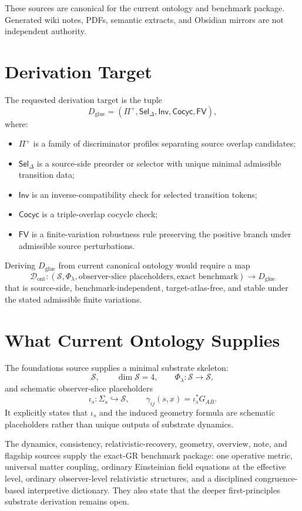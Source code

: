\documentclass[11pt]{article}
\newcommand{\Sub}{\mathcal{S}}
\newcommand{\PhiOrd}{\Phi_{\lambda}}
\newcommand{\Prof}{\Pi^{+}}
\newcommand{\Sel}{\mathsf{Sel}_{\Delta}}
\begin{document}
These sources are canonical for the current ontology and benchmark package.
Generated wiki notes, PDFs, semantic extracts, and Obsidian mirrors are not
independent authority.

\section{Derivation Target}

The requested derivation target is the tuple
\[
  D_{\mathrm{glue}}
  =
  (\Prof,\Sel,\mathsf{Inv},\mathsf{Cocyc},\mathsf{FV}),
\]
where:
\begin{itemize}
  \item \(\Prof\) is a family of discriminator profiles separating source
  overlap candidates;
  \item \(\Sel\) is a source-side preorder or selector with unique minimal
  admissible transition data;
  \item \(\mathsf{Inv}\) is an inverse-compatibility check for selected
  transition tokens;
  \item \(\mathsf{Cocyc}\) is a triple-overlap cocycle check;
  \item \(\mathsf{FV}\) is a finite-variation robustness rule preserving the
  positive branch under admissible source perturbations.
\end{itemize}

Deriving \(D_{\mathrm{glue}}\) from current canonical ontology would require a
map
\[
  \mathcal{D}_{\mathrm{ont}}:
  (\Sub,\PhiOrd,\text{observer-slice placeholders},\text{exact benchmark})
  \longrightarrow
  D_{\mathrm{glue}}
\]
that is source-side, benchmark-independent, target-atlas-free, and stable
under the stated admissible finite variations.

\section{What Current Ontology Supplies}

The foundations source supplies a minimal substrate skeleton:
\[
  \Sub,\qquad \dim \Sub = 4,\qquad
  \Phi_{\lambda}:\Sub\to\Sub,
\]
and schematic observer-slice placeholders
\[
  \iota_s:\Sigma_s\hookrightarrow\Sub,
  \qquad
  \gamma_{ij}(s,x)=\iota_s^*G_{AB}.
\]
It explicitly states that \(\iota_s\) and the induced geometry formula are
schematic placeholders rather than unique outputs of substrate dynamics.

The dynamics, consistency, relativistic-recovery, geometry, overview, note,
and flagship sources supply the exact-GR benchmark package: one operative
metric, universal matter coupling, ordinary Einsteinian field equations at
the effective level, ordinary observer-level relativistic structures, and a
disciplined congruence-based interpretive dictionary. They also state that
the deeper first-principles substrate derivation remains open.
\end{document}

